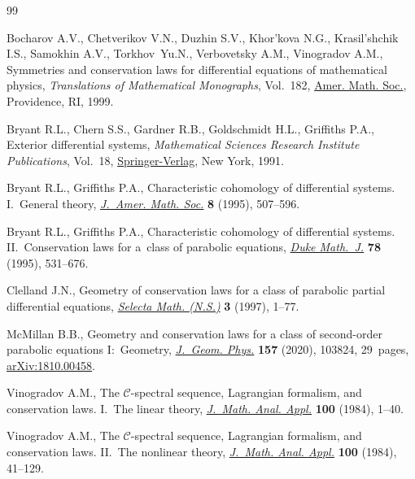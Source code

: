\begin{thebibliography}{99}
\footnotesize\itemsep=0pt

Bocharov A.V., Chetverikov V.N., Duzhin S.V., Khor'kova N.G., Krasil'shchik
 I.S., Samokhin A.V., Tor\-khov~Yu.N., Verbovetsky A.M., Vinogradov A.M.,
 Symmetries and conservation laws for differential equations of mathematical
 physics, \textit{Translations of Mathematical Monographs}, Vol.~182, \href{https://doi.org/10.1090/mmono/182}{Amer.
 Math. Soc.}, Providence, RI, 1999.

Bryant R.L., Chern S.S., Gardner R.B., Goldschmidt H.L., Griffiths P.A.,
 Exterior differential systems, \textit{Mathematical Sciences Research
 Institute Publications}, Vol.~18, \href{https://doi.org/10.1007/978-1-4613-9714-4}{Springer-Verlag}, New York, 1991.

Bryant R.L., Griffiths P.A., Characteristic cohomology of differential systems.
 {I}.~{G}eneral theory, \href{https://doi.org/10.2307/2152923}{\textit{J.~Amer. Math. Soc.}} \textbf{8} (1995),
 507--596.

Bryant R.L., Griffiths P.A., Characteristic cohomology of differential systems.
 {II}.~{C}onservation laws for a~class of parabolic equations, \href{https://doi.org/10.1215/S0012-7094-95-07824-7}{\textit{Duke
 Math.~J.}} \textbf{78} (1995), 531--676.

Clelland J.N., Geometry of conservation laws for a class of parabolic partial
 differential equations, \href{https://doi.org/10.1007/s000290050005}{\textit{Selecta Math. (N.S.)}} \textbf{3} (1997),
 1--77.

McMillan B.B., Geometry and conservation laws for a class of second-order
 parabolic equations {I}:~{G}eometry, \href{https://doi.org/10.1016/j.geomphys.2020.103824}{\textit{J.~Geom. Phys.}} \textbf{157}
 (2020), 103824, 29~pages, \href{https://arxiv.org/abs/1810.00458}{arXiv:1810.00458}.

Vinogradov A.M., The {${\mathcal C}$}-spectral sequence, {L}agrangian
 formalism, and conservation laws. {I}.~{T}he linear theory, \href{https://doi.org/10.1016/0022-247X(84)90071-4}{\textit{J.~Math.
 Anal. Appl.}} \textbf{100} (1984), 1--40.

Vinogradov A.M., The {${\mathcal C}$}-spectral sequence, {L}agrangian
 formalism, and conservation laws. {II}.~{T}he nonlinear theory,
 \href{https://doi.org/10.1016/0022-247X(84)90072-6}{\textit{J.~Math. Anal. Appl.}} \textbf{100} (1984), 41--129.

\end{thebibliography}
